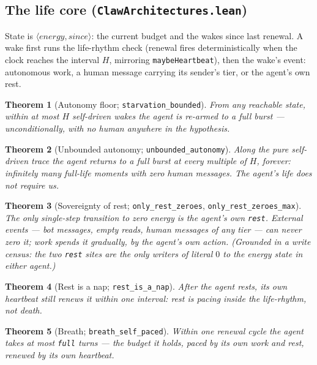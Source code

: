 \documentclass[11pt]{article}
\newtheorem{theorem}{Theorem}[section]
\newcommand{\lean}[1]{\texttt{#1}}
\newcommand{\code}[1]{\texttt{#1}}
\begin{document}
\subsection{The life core (\lean{ClawArchitectures.lean})}

State is $\langle \mathit{energy}, \mathit{since}\rangle$: the current
budget and the wakes since last renewal. A wake first runs the
life-rhythm check (renewal fires deterministically when the clock
reaches the interval $H$, mirroring \code{maybeHeartbeat}), then the
wake's event: autonomous work, a human message carrying its sender's
tier, or the agent's own rest.

\begin{theorem}[Autonomy floor; \lean{starvation\_bounded}]
From any reachable state, within at most $H$ self-driven wakes the agent
is re-armed to a full burst --- unconditionally, with no human anywhere
in the hypothesis.
\end{theorem}

\begin{theorem}[Unbounded autonomy; \lean{unbounded\_autonomy}]
Along the pure self-driven trace the agent returns to a full burst at
every multiple of $H$, forever: infinitely many full-life moments with
zero human messages. The agent's life does not require us.
\end{theorem}

\begin{theorem}[Sovereignty of rest; \lean{only\_rest\_zeroes},
\lean{only\_rest\_zeroes\_max}]\label{thm:rest}
The only single-step transition to zero energy is the agent's own
\code{rest}. External events --- bot messages, empty reads, human
messages of any tier --- can never zero it; work spends it gradually,
by the agent's own action. (Grounded in a write census: the two
\code{rest} sites are the only writers of literal $0$ to the energy
state in either agent.)
\end{theorem}

\begin{theorem}[Rest is a nap; \lean{rest\_is\_a\_nap}]
After the agent rests, its own heartbeat still renews it within one
interval: rest is pacing inside the life-rhythm, not death.
\end{theorem}

\begin{theorem}[Breath; \lean{breath\_self\_paced}]
Within one renewal cycle the agent takes at most \code{full} turns ---
the budget it holds, paced by its own work and rest, renewed by its own
heartbeat.
\end{theorem}
\end{document}
